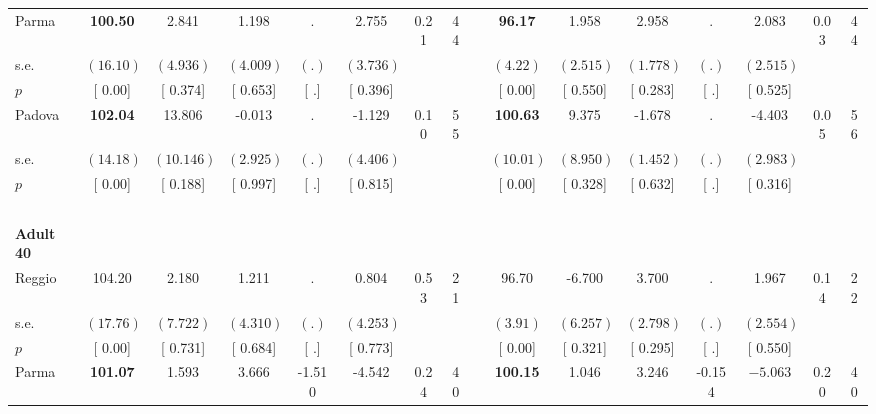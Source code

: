 \begin{longtable}{L{8em} c c c c c c c p{1em} c c c c c c c}
\quad \quad \quad Parma& \textbf{   100.50} &     2.841 &     1.198 &         . &     2.755 &      0.21 &        44 & & \textbf{    96.17} &     1.958 &     2.958 &         . &     2.083 &      0.03 &        44  \\*
\quad \quad \quad \quad s.e.& $ (    16.10)$ & $ (    4.936)$ & $ (    4.009)$ & $ (        .)$ & $ (    3.736)$ & & & & $ (     4.22)$ & $ (    2.515)$ & $ (    1.778)$ & $ (        .)$ & $ (    2.515)$ & &  \\*
\quad \quad \quad \quad $ p$ & [     0.00] & [    0.374] & [    0.653] & [        .] & [    0.396] & & & & [     0.00] & [    0.550] & [    0.283] & [        .] & [    0.525] & &  \\[1em]
\quad \quad \quad Padova& \textbf{   102.04} &    13.806 &    -0.013 &         . &    -1.129 &      0.10 &        55 & & \textbf{   100.63} &     9.375 &    -1.678 &         . &    -4.403 &      0.05 &        56  \\*
\quad \quad \quad \quad s.e.& $ (    14.18)$ & $ (   10.146)$ & $ (    2.925)$ & $ (        .)$ & $ (    4.406)$ & & & & $ (    10.01)$ & $ (    8.950)$ & $ (    1.452)$ & $ (        .)$ & $ (    2.983)$ & &  \\*
\quad \quad \quad \quad $ p$ & [     0.00] & [    0.188] & [    0.997] & [        .] & [    0.815] & & & & [     0.00] & [    0.328] & [    0.632] & [        .] & [    0.316] & &  \\[1em]
~\\[1em]
\quad \quad \textbf{Adult 40} & & & & & & & & & & & & & & & \\* 
\quad \quad \quad Reggio& 104.20 &     2.180 &     1.211 &         . &     0.804 &      0.53 &        21 & & 96.70 &    -6.700 &     3.700 &         . &     1.967 &      0.14 &        22  \\*
\quad \quad \quad \quad s.e.& $ (    17.76)$ & $ (    7.722)$ & $ (    4.310)$ & $ (        .)$ & $ (    4.253)$ & & & & $ (     3.91)$ & $ (    6.257)$ & $ (    2.798)$ & $ (        .)$ & $ (    2.554)$ & &  \\*
\quad \quad \quad \quad $ p$ & [     0.00] & [    0.731] & [    0.684] & [        .] & [    0.773] & & & & [     0.00] & [    0.321] & [    0.295] & [        .] & [    0.550] & &  \\[1em]
\quad \quad \quad Parma& \textbf{   101.07} &     1.593 &     3.666 &    -1.510 &    -4.542 &      0.24 &        40 & & \textbf{   100.15} &     1.046 &     3.246 &    -0.154 & $ \mathbf{   -5.063}$ &      0.20 &        40  \\*

\end{longtable}
